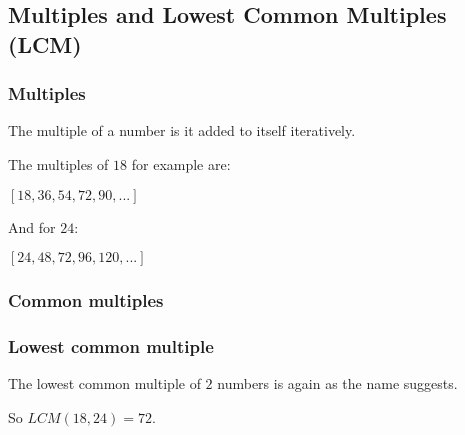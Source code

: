 
\subsection{Multiples and Lowest Common Multiples (LCM)}

\subsubsection{Multiples}

The multiple of a number is it added to itself iteratively.

The multiples of \(18\) for example are:

\([18,36,54,72,90,...]\)

And for \(24\):

\([24,48,72,96,120,...]\)

\subsubsection{Common multiples}

\subsubsection{Lowest common multiple}

The lowest common multiple of \(2\) numbers is again as the name suggests.

So \(LCM(18,24)=72\).
	
